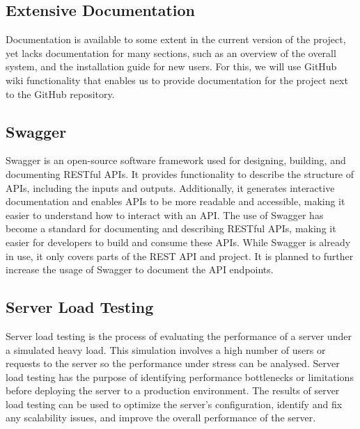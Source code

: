 \documentclass{article}
\begin{document}
        \subsection{Extensive Documentation}

            Documentation is available to some extent in the current version of the project, yet lacks documentation for many sections, such as an overview of the overall system, and the installation guide for new users.
            For this, we will use GitHub wiki functionality that enables us to provide documentation for the project next to the GitHub repository.
            
        \subsection{Swagger}
             
            Swagger \cite{swaggerAPIDocumentationDesign} is an open-source software framework used for designing, building, and documenting RESTful APIs.
            It provides functionality to describe the structure of APIs, including the inputs and outputs. Additionally, it generates interactive documentation and enables APIs to be more readable and accessible, making it easier to understand how to interact with an API.
            The use of Swagger has become a standard for documenting and describing RESTful APIs, making it easier for developers to build and consume these APIs.
            While Swagger is already in use, it only covers parts of the REST API and project.
            It is planned to further increase the usage of Swagger to document the API endpoints.
        
        \subsection{Server Load Testing}

            Server load testing is the process of evaluating the performance of a server under a simulated heavy load.
            This simulation involves a high number of users or requests to the server so the performance under stress can be analysed.
            Server load testing has the purpose of identifying performance bottlenecks or limitations before deploying the server to a production environment.
            The results of server load testing can be used to optimize the server's configuration, identify and fix any scalability issues, and improve the overall performance of the server.

\pagebreak
    
    
\pagebreak
    
    
\end{document}
